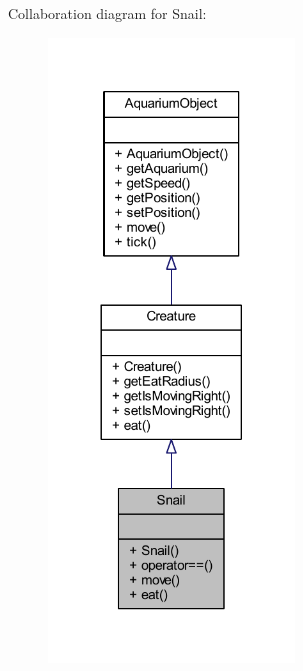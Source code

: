 Collaboration diagram for Snail\+:
\nopagebreak
\begin{figure}[H]
\begin{center}
\leavevmode
\includegraphics[width=185pt]{class_snail__coll__graph}
\end{center}
\end{figure}
